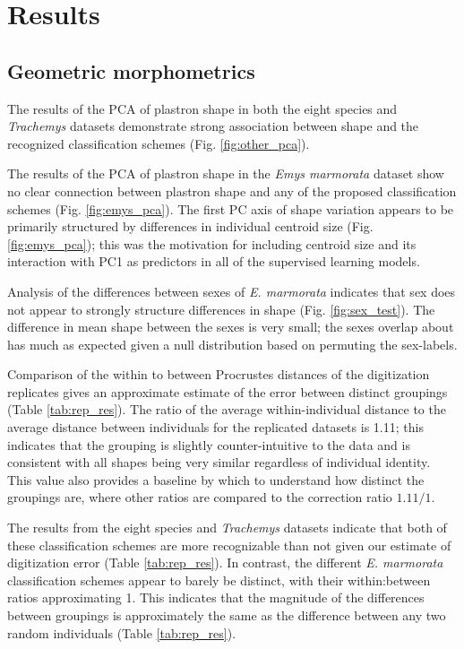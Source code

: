 \documentclass[11pt]{article}
\begin{document}
\section*{Results}

\subsection*{Geometric morphometrics}

The results of the PCA of plastron shape in both the eight species and \textit{Trachemys} datasets demonstrate strong association between shape and the recognized classification schemes (Fig. \ref{fig:other_pca}).

The results of the PCA of plastron shape in the \textit{Emys marmorata} dataset show no clear connection between plastron shape and any of the proposed classification schemes (Fig. \ref{fig:emys_pca}). The first PC axis of shape variation appears to be primarily structured by differences in individual centroid size (Fig. \ref{fig:emys_pca}); this was the motivation for including centroid size and its interaction with PC1 as predictors in all of the supervised learning models.


Analysis of the differences between sexes of \textit{E. marmorata} indicates that sex does not appear to strongly structure differences in shape (Fig. \ref{fig:sex_test}). The difference in mean shape between the sexes is very small; the sexes overlap about has much as expected given a null distribution based on permuting the sex-labels.


Comparison of the within to between Procrustes distances of the digitization replicates gives an approximate estimate of the error between distinct groupings (Table \ref{tab:rep_res}). The ratio of the average within-individual distance to the average distance between individuals for the replicated datasets is 1.11; this indicates that the grouping is slightly counter-intuitive to the data and is consistent with all shapes being very similar regardless of individual identity. This value also provides a baseline by which to understand how distinct the groupings are, where other ratios are compared to the correction ratio \(1.11/1\). 

The results from the eight species and \textit{Trachemys} datasets indicate that both of these classification schemes are more recognizable than not given our estimate of digitization error (Table \ref{tab:rep_res}). In contrast, the different \textit{E. marmorata} classification schemes appear to barely be distinct, with their within:between ratios approximating 1. This indicates that the magnitude of the differences between groupings is approximately the same as the difference between any two random individuals (Table \ref{tab:rep_res}).
\end{document}
